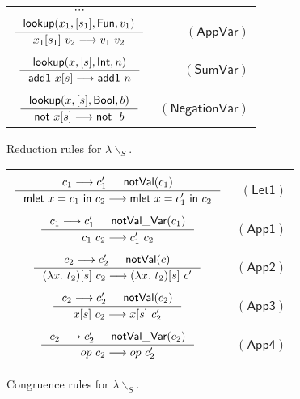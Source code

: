 \documentclass[preprint,authoryear,sort&compress,9pt,nocopyrightspace]{article}
\newcommand\rulename[1]{\mathsf{(#1)}}
\newcommand{\tto}{\longrightarrow}
\newcommand{\conf}[2][s]{(#2)[#1]}
\newcommand{\oletP}[3]{\mathsf{mlet} \ x = #2 \ \mathsf{in}  \ #3}
\newcommand{\absST}[2]{\lambda #1. \ #2}
\newcommand{\negacion}[1]{\mathsf{not} \ #1}
\newcommand{\suma}[1]{\mathsf{add1} \ #1}
\newcommand{\boolt}{\mathsf{Bool}}
\newcommand{\intt}{\mathsf{Int}}
\newcommand{\funt}{\mathsf{Fun}}
\newcommand{\novalvar}[1]{\mathsf{notVal\_Var}(#1)}
\newcommand{\noval}[1]{\mathsf{notVal}(#1)}
\newcommand{\buscar}{\mathsf{lookup}}
\newcommand{\semanticB}{${\lambda}{\backslash}_S$}
\begin{document}
\begin{figure}[h]
\begin{small}
\begin{center}
\begin{tabular}{|c r|}
\hline
$\cdots$&\\
$\inference{ \buscar(x_1, [s_1],\funt, v_1)}{x_1[s_1] \ v_2 \tto v_1 \ v_2}$&$\rulename{AppVar}$\\
&\\
$\inference{\buscar(x, [s], \intt, n)}{\suma{x[s]} \tto \suma{n}}$&$\rulename{SumVar}$\\
&\\
$\inference{\buscar(x, [s], \boolt, b)}{\negacion{x[s]} \tto \negacion \ b}$&$\rulename{NegationVar}$\\
\hline
\end{tabular}
\caption{Reduction rules for \semanticB.}
\label{tabla:reductionRules2}
\end{center}
\end{small}
\end{figure}

\begin{figure}[h]
\begin{small}
\begin{center}
\begin{tabular}{|c r|}
\hline
&\\
$ \inference {c_1 \tto c_1' & \noval{c_1}}{\oletP{T_1}{c_1}{c_2} \tto \oletP{T_1}{c_1'}{c_2} }$&$\rulename{Let1} $\\
&\\
$\inference {c_1 \tto c_1' & \novalvar{c_1}}{c_1 \ c_2 \tto c_1' \ c_2} $&$\rulename{App1}  $\\
&\\
$ \inference {c_2 \tto c_2' & \noval{c}}{\conf{\absST{x}{t_2}} \ c_2 \tto \conf{\absST{x}{t_2}} \ c'}$&$\rulename{App2}  $\\
&\\
$ \inference {c_2 \tto c_2' & \noval{c_2}}{x[s] \ c_2 \tto x[s] \ c_2'}$&$\rulename{App3}  $\\
&\\
$ \inference {c_2 \tto c_2' & \novalvar{c_2}}{op \ c_2 \tto op \ c_2'}$&$\rulename{App4}  $\\
\hline
\end{tabular}
\caption{Congruence rules for \semanticB.}
\label{tabla:congruenceRules2}
\end{center}
\end{small}
\end{figure}
\end{document}

